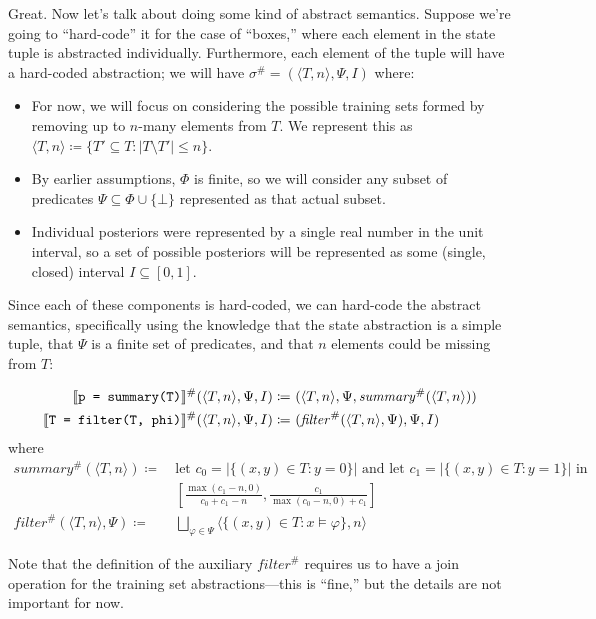 Great. Now let's talk about doing some kind of abstract semantics.
Suppose we're going to ``hard-code'' it for the case of ``boxes,''
where each element in the state tuple is abstracted individually.
Furthermore, each element of the tuple will have a hard-coded abstraction;
we will have $\sigma^\# = (\langle T, n \rangle, \Psi, I)$ where:
\begin{itemize}
    \item For now, we will focus on considering the possible training sets formed
        by removing up to $n$-many elements from $T$.
        We represent this as $\langle T, n \rangle
        \coloneqq \{T' \subseteq T : \lvert T \setminus T' \rvert \leq n\}$.
    \item By earlier assumptions, $\Phi$ is finite, so we will consider
        any subset of predicates $\Psi \subseteq \Phi \cup \{\bot\}$
        represented as that actual subset.
    \item Individual posteriors were represented by a single real number in the unit interval,
        so a set of possible posteriors will be represented
        as some (single, closed) interval $I \subseteq [0, 1]$.
\end{itemize}
Since each of these components is hard-coded, we can hard-code the abstract semantics,
specifically using the knowledge that the state abstraction is a simple tuple,
that $\Psi$ is a finite set of predicates,
and that $n$ elements could be missing from $T$:
\begin{center}
\begin{align*}
    \den{\summarynode}^\#(\langle T, n \rangle, \Psi, I) \coloneqq&~
    (\langle T, n \rangle, \Psi, \mathit{summary}^\#(\langle T, n \rangle)) \\
    \den{\filternode}^\#(\langle T, n \rangle, \Psi, I) \coloneqq &~
    (\mathit{filter}^\#(\langle T, n \rangle, \Psi), \Psi, I)
\end{align*}
where
\begin{align*}
    \mathit{summary}^\#(\langle T, n \rangle) \coloneqq&~
    \text{let } c_0 = \lvert \{(x,y) \in T : y = 0\} \rvert
    \text{ and let } c_1 = \lvert \{(x,y) \in T : y = 1\} \rvert
    \text{ in} \\
    &~ \left[
    \frac{\max(c_1 - n, 0)}{c_0 + c_1 - n},
    \frac{c_1}{\max(c_0 - n, 0) + c_1} \right] \\
    \mathit{filter}^\#(\langle T, n \rangle, \Psi) \coloneqq&~
    \bigsqcup_{\varphi \in \Psi} \langle \{(x,y) \in T : x \models \varphi\}, n \rangle
\end{align*}
\end{center}
Note that the definition of the auxiliary $\mathit{filter}^\#$
requires us to have a join operation for the training set abstractions---this is ``fine,''
but the details are not important for now.

